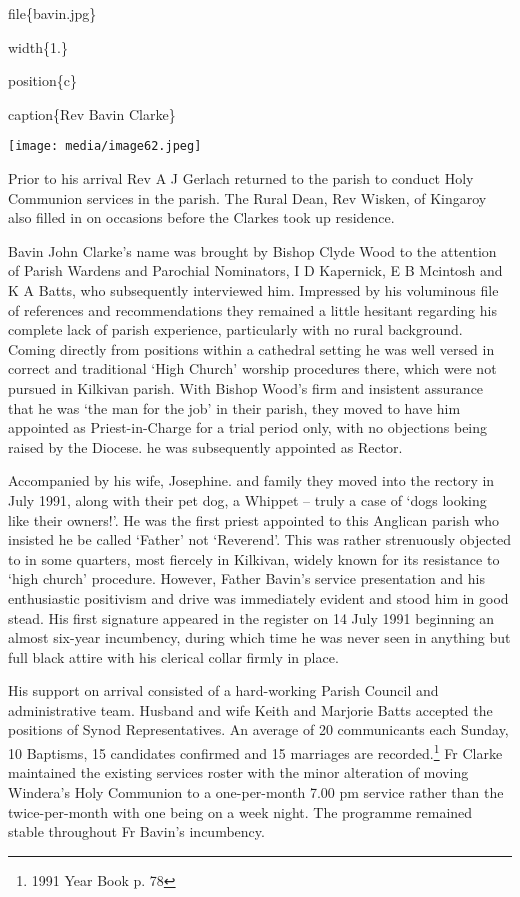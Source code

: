 file\{bavin.jpg\}

width\{1.\}

position\{c\}

caption\{Rev Bavin Clarke\}

\texttt{[image: media/image62.jpeg]}

Prior to his arrival Rev A J Gerlach returned to the parish to conduct Holy Communion services in the parish. The Rural Dean, Rev Wisken, of Kingaroy also filled in on occasions before the Clarkes took up residence.

Bavin John Clarke's name was brought by Bishop Clyde Wood to the attention of Parish Wardens and Parochial Nominators, I D Kapernick, E B Mcintosh and K A Batts, who subsequently interviewed him. Impressed by his voluminous file of references and recommendations they remained a little hesitant regarding his complete lack of parish experience, particularly with no rural background. Coming directly from positions within a cathedral setting he was well versed in correct and traditional `High Church' worship procedures there, which were not pursued in Kilkivan parish. With Bishop Wood's firm and insistent assurance that he was `the man for the job' in their parish, they moved to have him appointed as Priest-in-Charge for a trial period only, with no objections being raised by the Diocese. he was subsequently appointed as Rector.

Accompanied by his wife, Josephine. and family they moved into the rectory in July 1991, along with their pet dog, a Whippet -- truly a case of `dogs looking like their owners!'. He was the first priest appointed to this Anglican parish who insisted he be called `Father' not `Reverend'. This was rather strenuously objected to in some quarters, most fiercely in Kilkivan, widely known for its resistance to `high church' procedure. However, Father Bavin's service presentation and his enthusiastic positivism and drive was immediately evident and stood him in good stead. His first signature appeared in the register on 14 July 1991 beginning an almost six-year incumbency, during which time he was never seen in anything but full black attire with his clerical collar firmly in place.

His support on arrival consisted of a hard-working Parish Council and administrative team. Husband and wife Keith and Marjorie Batts accepted the positions of Synod Representatives. An average of 20 communicants each Sunday, 10 Baptisms, 15 candidates confirmed and 15 marriages are recorded.\footnote{1991 Year Book p. 78} Fr Clarke maintained the existing services roster with the minor alteration of moving Windera's Holy Communion to a one-per-month 7.00 pm service rather than the twice-per-month with one being on a week night. The programme remained stable throughout Fr Bavin's incumbency.

